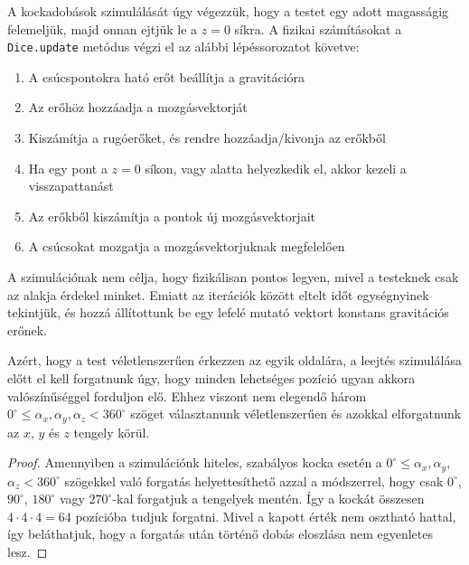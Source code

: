 
A kockadobások szimulálását úgy végezzük, hogy a testet egy adott magasságig felemeljük, majd onnan ejtjük le a $z=0$ síkra.
A fizikai számításokat a \texttt{Dice.update} metódus végzi el az alábbi lépéssorozatot követve:
\begin{enumerate}
	\item A csúcspontokra ható erőt beállítja a gravitációra
	\item Az erőhöz hozzáadja a mozgásvektorját
	\item Kiszámítja a rugóerőket, és rendre hozzáadja/kivonja az erőkből
	\item Ha egy pont a $z=0$ síkon, vagy alatta helyezkedik el, akkor kezeli a visszapattanást
	\item Az erőkből kiszámítja a pontok új mozgásvektorjait
	\item A csúcsokat mozgatja a mozgásvektorjuknak megfelelően 
\end{enumerate}
A szimulációnak nem célja, hogy fizikálisan pontos legyen, mivel a testeknek csak az alakja érdekel minket.
Emiatt az iterációk között eltelt időt egységnyinek tekintjük, és hozzá állítottunk be egy lefelé mutató vektort konstans gravitációs erőnek.

\label{subs:randompoint}

Azért, hogy a test véletlenszerűen érkezzen az egyik oldalára, a leejtés szimulálása előtt el kell forgatnunk úgy, hogy minden lehetséges pozíció ugyan akkora valószínűséggel forduljon elő.
Ehhez viszont nem elegendő három $0^\circ \leq \alpha_x,\alpha_y,\alpha_z <360^\circ$ szöget választanunk véletlenszerűen és azokkal elforgatnunk az $x$, $y$ és $z$ tengely körül.
\begin{proof}
Amennyiben a szimulációnk hiteles, szabályos kocka esetén a $0^\circ \leq \alpha_x,\alpha_y,$ $\alpha_z <360^\circ$ szögekkel való forgatás helyettesíthető azzal a módszerrel, hogy csak $0^\circ$, $90^\circ$, $180^\circ$ vagy $270^\circ$-kal forgatjuk a tengelyek mentén. Így a kockát összesen $4\cdot 4\cdot 4 = 64$ pozícióba tudjuk forgatni. Mivel a kapott érték nem osztható hattal, így beláthatjuk, hogy a forgatás után történő dobás eloszlása nem egyenletes lesz. 
\end{proof}

